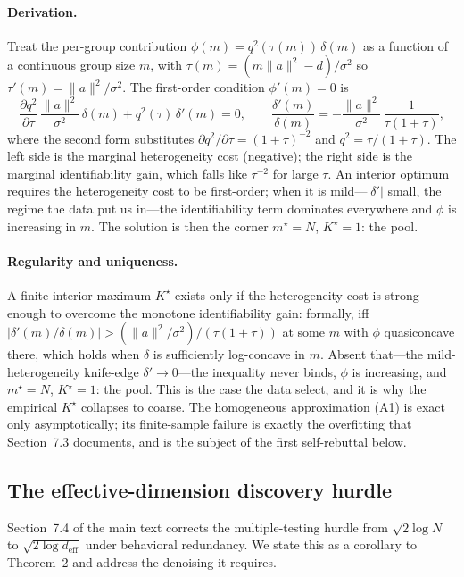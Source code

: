 \documentclass[12pt]{article}
\theoremstyle{plain}
\theoremstyle{definition}
\begin{document}
\paragraph{Derivation.} Treat the per-group contribution $\phi(m)=q^2(\tau(m))\,
\delta(m)$ as a function of a continuous group size $m$, with
$\tau(m)=(m\lVert a\rVert^2-d)/\sigma^2$ so $\tau'(m)=\lVert a\rVert^2/\sigma^2$.
The first-order condition $\phi'(m)=0$ is
\begin{equation}
\label{eq:foc-ia}
\frac{\partial q^2}{\partial\tau}\,\frac{\lVert a\rVert^2}{\sigma^2}\,\delta(m)
+q^2(\tau)\,\delta'(m)=0,
\qquad
\frac{\delta'(m)}{\delta(m)}=-\frac{\lVert a\rVert^2}{\sigma^2}\,
\frac{1}{\tau(1+\tau)},
\end{equation}
where the second form substitutes $\partial q^2/\partial\tau=(1+\tau)^{-2}$ and
$q^2=\tau/(1+\tau)$. The left side is the marginal heterogeneity cost (negative);
the right side is the marginal identifiability gain, which falls like
$\tau^{-2}$ for large $\tau$. An interior optimum requires the heterogeneity cost
to be first-order; when it is mild---$|\delta'|$ small, the regime the data put
us in---the identifiability term dominates everywhere and $\phi$ is increasing in
$m$. The solution is then the corner $m^\star=N$, $K^\star=1$: the pool.

\paragraph{Regularity and uniqueness.} A finite interior maximum $K^\star$ exists
only if the heterogeneity cost is strong enough to overcome the monotone
identifiability gain: formally, iff $|\delta'(m)/\delta(m)|>(\lVert
a\rVert^2/\sigma^2)/(\tau(1+\tau))$ at some $m$ with $\phi$ quasiconcave there,
which holds when $\delta$ is sufficiently log-concave in $m$. Absent that---the
mild-heterogeneity knife-edge $\delta'\to0$---the inequality never binds, $\phi$
is increasing, and $m^\star=N$, $K^\star=1$: the pool. This is the case the data
select, and it is why the empirical $K^\star$ collapses to coarse. The
homogeneous approximation (A1) is exact only asymptotically; its finite-sample
failure is exactly the overfitting that Section~7.3 documents, and is the subject
of the first self-rebuttal below.
\subsection{The effective-dimension discovery hurdle}
\label{ia:deff}

Section~7.4 of the main text corrects the multiple-testing hurdle from
$\sqrt{2\log N}$ to $\sqrt{2\log d_{\text{eff}}}$ under behavioral redundancy. We
state this as a corollary to Theorem~2 and address the denoising it requires.
\end{document}
